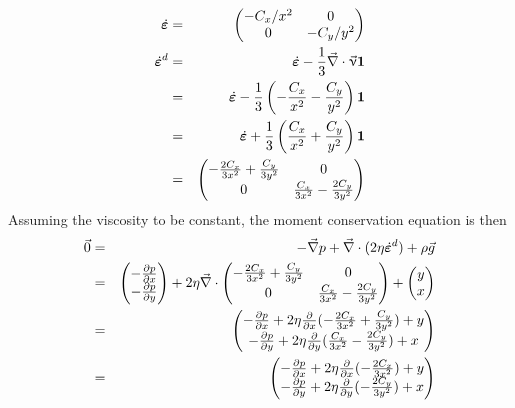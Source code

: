\begin{eqnarray}
\dot{\bm \varepsilon} 
&=& 
\begin{pmatrix}
-C_x/x^ 2 & 0 \\
0 & -C_y/y^2
\end{pmatrix} \nonumber\\
\dot{\bm \varepsilon}^d 
&=& \dot{\bm \varepsilon} -\frac13  \vec\nabla \cdot \vec\upnu {\bm 1} \nonumber\\
&=& \dot{\bm \varepsilon} -\frac13  \left( -\frac{C_x}{x^2} - \frac{C_y}{y^2} \right) {\bm 1} \nonumber\\
&=&\dot{\bm \varepsilon} +\frac13  \left( \frac{C_x}{x^2} + \frac{C_y}{y^2}  \right) {\bm 1} \nonumber\\
&=&
\begin{pmatrix}
-\frac{2C_x}{3x^2} + \frac{C_y}{3y^2} & 0 \\
0 & \frac{C_x}{3x^2} - \frac{2C_y}{3y^2}
\end{pmatrix} \nonumber
\end{eqnarray}
Assuming the viscosity to be constant, the moment conservation equation is then
\begin{eqnarray}
\vec{0}&=& -\vec\nabla p + \vec\nabla \cdot (2 \eta \dot{\bm \varepsilon}^d )+ \rho \vec{g} \nonumber\\
&=& 
\begin{pmatrix} 
-\frac{\partial p}{\partial x} \\
-\frac{\partial p}{\partial y} 
\end{pmatrix} 
+  2 \eta \vec\nabla \cdot   
\begin{pmatrix}
-\frac{2C_x}{3x^2} + \frac{C_y}{3y^2} & 0 \\
0 & \frac{C_x}{3x^2} - \frac{2C_y}{3y^2}
\end{pmatrix}
+ 
\begin{pmatrix}
y \\x
\end{pmatrix} \nonumber\\
&=&
\begin{pmatrix} 
-\frac{\partial p}{\partial x} + 2\eta \frac{\partial}{\partial x} (-\frac{2C_x}{3x^2} +\frac{C_y}{3y^2})+ y \\
-\frac{\partial p}{\partial y} + 2\eta \frac{\partial}{\partial y} (\frac{C_x}{3x^2} -\frac{2C_y}{3y^2})+ x 
\end{pmatrix} \nonumber\\
&=& 
\begin{pmatrix} 
-\frac{\partial p}{\partial x} + 2\eta \frac{\partial}{\partial x} (-\frac{2C_x}{3x^2} )+ y \\
-\frac{\partial p}{\partial y} + 2\eta \frac{\partial}{\partial y} (-\frac{2C_y}{3y^2})+ x 
\end{pmatrix} 
\end{eqnarray}
